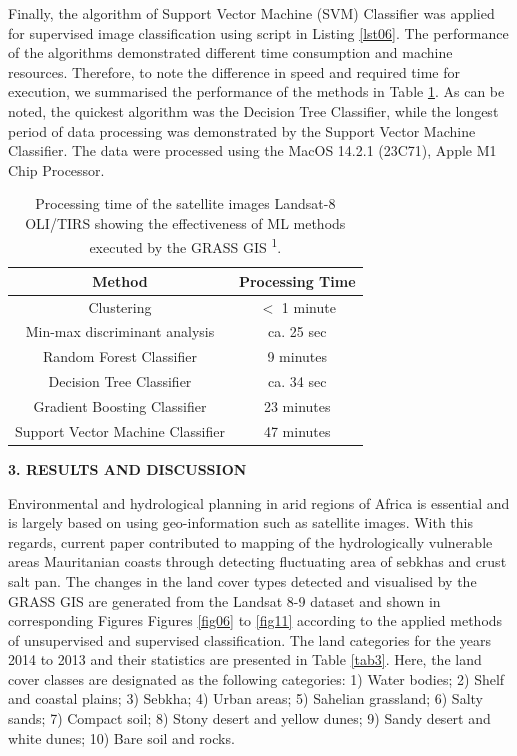 \documentclass[12pt,a4paper,oneside]{article}
\def \newsection{\vspace{12pt}\textbf}
\def \newpar{\vspace{6pt}}
\begin{document}
\newpar Finally, the algorithm of Support Vector Machine (SVM) Classifier was applied for supervised image classification using script in Listing \ref{lst06}. The performance of the algorithms demonstrated different time consumption and machine resources. Therefore, to note the difference in speed and required time for execution, we summarised the performance of the methods in Table \ref{tab2}. As can be noted, the quickest algorithm was the Decision Tree Classifier, while the longest period of data processing was demonstrated by the Support Vector Machine Classifier. The data were processed using the MacOS 14.2.1 (23C71), Apple M1 Chip Processor. 

\begin{table}[H]
\small
\caption{Processing time of the satellite images Landsat-8 OLI/TIRS showing the effectiveness of ML methods executed by the GRASS GIS \textsuperscript{1}.\label{tab2}}
\begin{tabularx}{\textwidth}{cc}
			\toprule
			\textbf{Method} & \textbf{Processing Time} \\
			\midrule
			Clustering & $<$ 1 minute \\
			Min-max discriminant analysis & ca. 25 sec \\
			Random Forest Classifier & 9 minutes  \\
			Decision Tree Classifier & ca. 34 sec \\
			Gradient Boosting Classifier & 23 minutes  \\
			Support Vector Machine Classifier & 47 minutes  \\
			\bottomrule
\end{tabularx}
\end{table}

\newsection {3. RESULTS AND DISCUSSION}

\newpar Environmental and hydrological planning in arid regions of Africa is essential and is largely based on using geo-information such as satellite images. With this regards, current paper contributed to mapping of the hydrologically vulnerable  areas Mauritanian coasts through detecting fluctuating area of sebkhas and crust salt pan. The changes in the land cover types detected and visualised by the GRASS GIS are generated from the Landsat 8-9 dataset and shown in corresponding Figures Figures \ref{fig06} to \ref{fig11} according to the applied methods of unsupervised and supervised classification. The land categories for the years 2014 to 2013 and their statistics are presented in Table \ref{tab3}. Here, the land cover classes are designated as the following categories: 1) Water bodies; 2) Shelf and coastal plains; 3) Sebkha; 4) Urban areas; 5) Sahelian grassland; 6) Salty sands; 7) Compact soil; 8) Stony desert and yellow dunes; 9) Sandy desert and white dunes; 10) Bare soil and rocks. 
\end{document}
